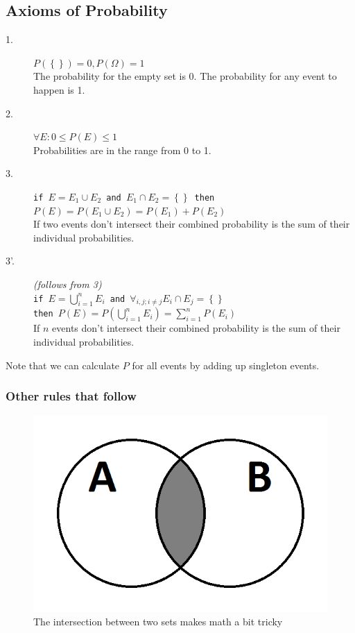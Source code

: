 \subsection{Axioms of Probability}
\begin{description}
	\item[1.] $P(\left\{\right\}) = 0, P(\Omega) = 1$
            \\ The probability for the empty set is 0. The probability for any event to happen is 1.
  \item[2.] $\forall E: 0 \leq P(E) \leq 1$
            \\ Probabilities are in the range from 0 to 1.
  \item[3.] \texttt{if $E = E_1 \cup E_2$ and $E_1 \cap E_2 = \left\{ \right\}$
            then $P(E) = P(E_1 \cup E_2) = P(E_1) + P(E_2)$}
            \\ If two events don't intersect their combined probability is the sum of their individual probabilities.
  \item[3'.] \textit{(follows from 3)} \\
            \texttt{if $E = \bigcup\limits_{i=1}^n E_i$ and $\forall_{i, j; i \neq j} E_i \cap E_j = \left\{ \right\}$ \\
            then $P(E) = P\left(\bigcup\limits_{i=1}^n E_i\right) = \sum\limits_{i=1}^{n}{P\left(E_i\right)}$}
            \\ If $n$ events don't intersect their combined probability is the sum of their individual probabilities.
\end{description}

Note that we can calculate $P$ for all events by adding up singleton events.

\subsubsection*{Other rules that follow}
\begin{figure}[ht]
  \begin{center}
    \includegraphics[scale=0.3]{images/venn_diagram_a_intersects_b}
    \caption{The intersection between two sets makes math a bit tricky}
    \label{fig:venn_a_inter_b}
  \end{center}
\end{figure}


